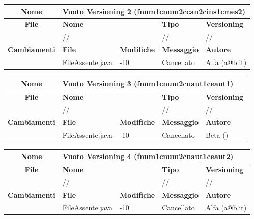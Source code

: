 \begin{table}[ht]
\footnotesize
\begin{tabular}{|c|p{2.5cm}|p{2cm}|p{2.5cm}|p{2.5cm}|}
  \hline
  \textbf{Nome}	& \multicolumn{4}{l|}{Vuoto Versioning 2 (fnum1cnum2ccan2cins1cmes2)} 									\\
  \hline
  \rowcolor{lightgray}\textbf{File} 		& \multicolumn{2}{l|}{\textbf{Nome}}		& \textbf{Tipo}		& \textbf{Versioning} 		\\
						\cline{2-5}
						& \multicolumn{2}{l|}{//}			& //			& //				\\
  \hline
  \rowcolor{lightgray}\textbf{Cambiamenti}	& \textbf{File}		&\textbf{Modifiche}	& \textbf{Messaggio}	& \textbf{Autore}		\\
						\cline{2-5}
						& FileAssente.java	& -10	  		& Cancellato		& Alfa (a@b.it)			\\
  \hline
\end{tabular}
\end{table}

\begin{table}[ht]
\footnotesize
\begin{tabular}{|c|p{2.5cm}|p{2cm}|p{2.5cm}|p{2.5cm}|}
  \hline
  \textbf{Nome}	& \multicolumn{4}{l|}{Vuoto Versioning 3 (fnum1cnum2cnaut1ceaut1)} 									\\
  \hline
  \rowcolor{lightgray}\textbf{File} 		& \multicolumn{2}{l|}{\textbf{Nome}}		& \textbf{Tipo}		& \textbf{Versioning} 		\\
						\cline{2-5}
						& \multicolumn{2}{l|}{//}			& //			& //				\\
  \hline
  \rowcolor{lightgray}\textbf{Cambiamenti}	& \textbf{File}		&\textbf{Modifiche}	& \textbf{Messaggio}	& \textbf{Autore}		\\
						\cline{2-5}
						& FileAssente.java	& -10	  		& Cancellato		& Beta ()			\\
  \hline
\end{tabular}
\end{table}

\begin{table}[ht]
\footnotesize
\begin{tabular}{|c|p{2.5cm}|p{2cm}|p{2.5cm}|p{2.5cm}|}
  \hline
  \textbf{Nome}	& \multicolumn{4}{l|}{Vuoto Versioning 4 (fnum1cnum2cnaut1ceaut2)} 									\\
  \hline
  \rowcolor{lightgray}\textbf{File} 		& \multicolumn{2}{l|}{\textbf{Nome}}		& \textbf{Tipo}		& \textbf{Versioning} 		\\
						\cline{2-5}
						& \multicolumn{2}{l|}{//}			& //			& //				\\
  \hline
  \rowcolor{lightgray}\textbf{Cambiamenti}	& \textbf{File}		&\textbf{Modifiche}	& \textbf{Messaggio}	& \textbf{Autore}		\\
						\cline{2-5}
						& FileAssente.java	& -10	  		& Cancellato		& Alfa (a@b.it)			\\
  \hline
\end{tabular}
\end{table}


